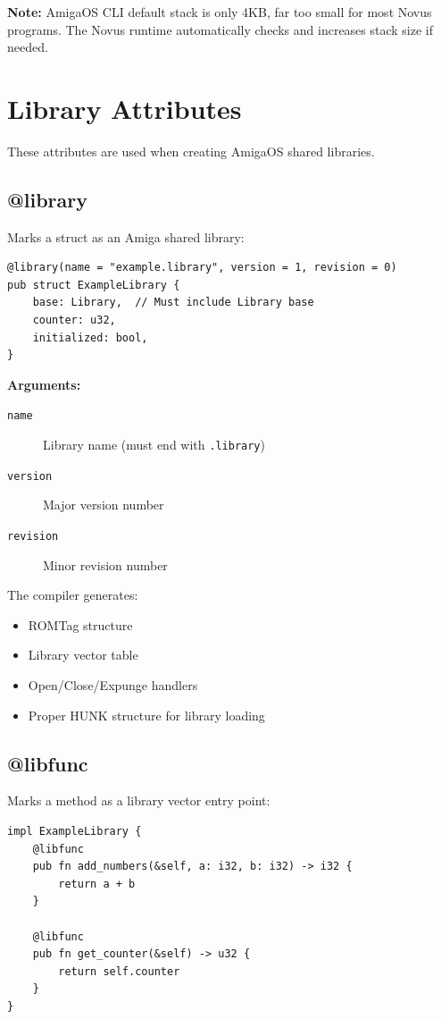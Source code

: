 \textbf{Note:} AmigaOS CLI default stack is only 4KB, far too small for most Novus programs. The Novus runtime automatically checks and increases stack size if needed.

\section{Library Attributes}
\label{sec:library-attributes}

These attributes are used when creating AmigaOS shared libraries.

\subsection{@library}

Marks a struct as an Amiga shared library:

\begin{lstlisting}
@library(name = "example.library", version = 1, revision = 0)
pub struct ExampleLibrary {
    base: Library,  // Must include Library base
    counter: u32,
    initialized: bool,
}
\end{lstlisting}

\textbf{Arguments:}
\begin{description}
    \item[\texttt{name}] Library name (must end with \texttt{.library})
    \item[\texttt{version}] Major version number
    \item[\texttt{revision}] Minor revision number
\end{description}

The compiler generates:
\begin{itemize}
    \item ROMTag structure
    \item Library vector table
    \item Open/Close/Expunge handlers
    \item Proper HUNK structure for library loading
\end{itemize}

\subsection{@libfunc}

Marks a method as a library vector entry point:

\begin{lstlisting}
impl ExampleLibrary {
    @libfunc
    pub fn add_numbers(&self, a: i32, b: i32) -> i32 {
        return a + b
    }

    @libfunc
    pub fn get_counter(&self) -> u32 {
        return self.counter
    }
}
\end{lstlisting}

